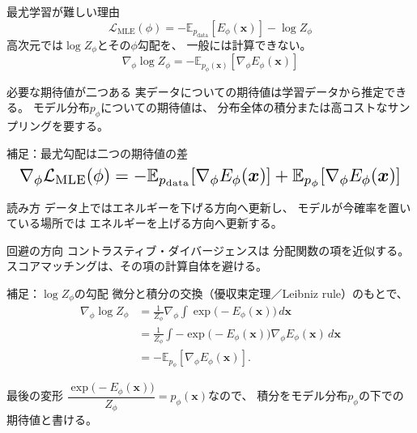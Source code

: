 \asmain
\begin{frame}{最尤学習が難しい理由}
    \[
        \mathcal{L}_{\mathrm{MLE}}(\phi)
        =
        -\mathbb{E}_{p_{\mathrm{data}}}[E_\phi(\bm{x})]
        -\log Z_\phi
        \tag{3.1.1}
\]
    高次元では$\log Z_\phi$とその$\phi$勾配を、
    一般には計算できない。
    \[
        \nabla_\phi\log Z_\phi
        =
        -\mathbb{E}_{p_\phi(\bm{x})}
        [\nabla_\phi E_\phi(\bm{x})]
\]
    \begin{block}{必要な期待値が二つある}
        実データについての期待値は学習データから推定できる。
        モデル分布$p_\phi$についての期待値は、
        分布全体の積分または高コストなサンプリングを要する。
    \end{block}
\end{frame}
\assuppl
\begin{frame}{補足：最尤勾配は二つの期待値の差}
    \[
        \resizebox{0.98\textwidth}{!}{$
        \nabla_\phi\mathcal{L}_{\mathrm{MLE}}(\phi)
        =
        -\mathbb{E}_{p_{\mathrm{data}}}
        [\nabla_\phi E_\phi(\bm{x})]
        +
        \mathbb{E}_{p_\phi}
        [\nabla_\phi E_\phi(\bm{x})]
        $}
\]
    \begin{exampleblock}{読み方}
        データ上ではエネルギーを下げる方向へ更新し、
        モデルが今確率を置いている場所では
        エネルギーを上げる方向へ更新する。
    \end{exampleblock}
    \begin{exampleblock}{回避の方向}
        コントラスティブ・ダイバージェンスは
        分配関数の項を近似する。
        スコアマッチングは、その項の計算自体を避ける。
    \end{exampleblock}
\end{frame}
\assuppl
\begin{frame}{補足：$\log Z_\phi$の勾配}
    微分と積分の交換（優収束定理／Leibniz rule）のもとで、
    \begin{align*}
        \nabla_\phi\log Z_\phi
        &=
        \frac{1}{Z_\phi}
        \nabla_\phi
        \int
        \exp\!\bigl(-E_\phi(\bm{x})\bigr)
        \,d\bm{x}\\[
4pt]
        &=
        \frac{1}{Z_\phi}
        \int
        -\exp\!\bigl(-E_\phi(\bm{x})\bigr)
        \nabla_\phi E_\phi(\bm{x})
        \,d\bm{x}\\[4pt]
        &=
        -\mathbb{E}_{p_\phi}
        [\nabla_\phi E_\phi(\bm{x})].
    \end{align*}
    \begin{exampleblock}{最後の変形}
        $\dfrac{\exp\!\bigl(-E_\phi(\bm{x})\bigr)}{Z_\phi}=p_\phi(\bm{x})$なので、
        積分をモデル分布$p_\phi$の下での期待値と書ける。
    \end{exampleblock}
\end{frame}
